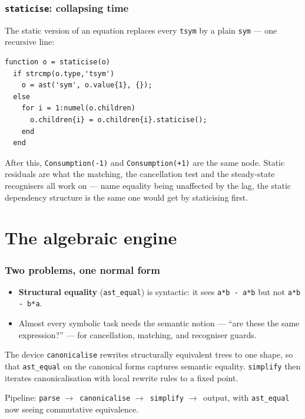\documentclass[10pt,slidestop]{beamer}
\newcommand{\code}[1]{\texttt{#1}}
\newcommand{\ra}{$\rightarrow$}
\begin{document}
\begin{frame}[fragile]\frametitle{\texttt{staticise}: collapsing time}
  The static version of an equation replaces every \code{tsym} by a plain
  \code{sym} --- one recursive line:

\begin{lstlisting}[style=ml]
function o = staticise(o)
  if strcmp(o.type,'tsym')
    o = ast('sym', o.value{1}, {});
  else
    for i = 1:numel(o.children)
      o.children{i} = o.children{i}.staticise();
    end
  end
\end{lstlisting}

  After this, \code{Consumption(-1)} and \code{Consumption(+1)} are the same
  node. Static residuals are what the matching, the cancellation test and the
  steady-state recognisers all work on --- name equality being unaffected by
  the lag, the static dependency structure is the same one would get by
  staticising first.
\end{frame}

\section{The algebraic engine}

\begin{frame}\frametitle{Two problems, one normal form}
  \begin{itemize}
  \item \textbf{Structural equality} (\code{ast\_equal}) is syntactic: it sees
    \code{a*b - a*b} but not \code{a*b - b*a}.\newline
  \item Almost every symbolic task needs the semantic notion --- ``are these the
    same expression?'' --- for cancellation, matching, and recogniser guards.\newline
  \end{itemize}

  \begin{block}{The device}
    \code{canonicalise} rewrites structurally equivalent trees to one shape, so
    that \code{ast\_equal} on the canonical forms captures semantic equality.
    \code{simplify} then iterates canonicalisation with local rewrite rules to a
    fixed point.
  \end{block}

  \medskip
  Pipeline: \quad\code{parse} \ra\ \code{canonicalise} \ra\ \code{simplify}
  \ra\ output, with \code{ast\_equal} now seeing commutative equivalence.
\end{frame}
\end{document}
